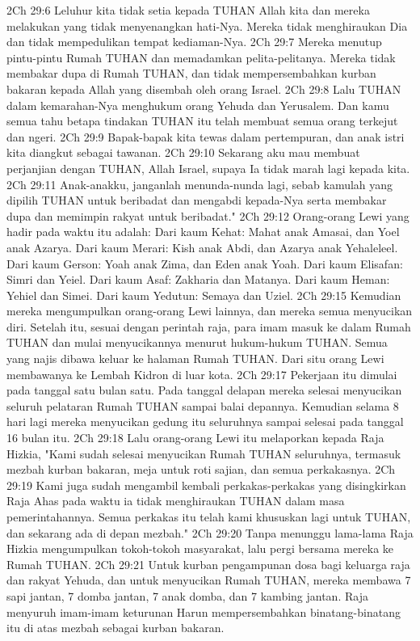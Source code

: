 2Ch 29:6  Leluhur kita tidak setia kepada TUHAN Allah kita dan mereka melakukan yang tidak menyenangkan hati-Nya. Mereka tidak menghiraukan Dia dan tidak mempedulikan tempat kediaman-Nya.
2Ch 29:7  Mereka menutup pintu-pintu Rumah TUHAN dan memadamkan pelita-pelitanya. Mereka tidak membakar dupa di Rumah TUHAN, dan tidak mempersembahkan kurban bakaran kepada Allah yang disembah oleh orang Israel.
2Ch 29:8  Lalu TUHAN dalam kemarahan-Nya menghukum orang Yehuda dan Yerusalem. Dan kamu semua tahu betapa tindakan TUHAN itu telah membuat semua orang terkejut dan ngeri.
2Ch 29:9  Bapak-bapak kita tewas dalam pertempuran, dan anak istri kita diangkut sebagai tawanan.
2Ch 29:10  Sekarang aku mau membuat perjanjian dengan TUHAN, Allah Israel, supaya Ia tidak marah lagi kepada kita.
2Ch 29:11  Anak-anakku, janganlah menunda-nunda lagi, sebab kamulah yang dipilih TUHAN untuk beribadat dan mengabdi kepada-Nya serta membakar dupa dan memimpin rakyat untuk beribadat."
2Ch 29:12  Orang-orang Lewi yang hadir pada waktu itu adalah: Dari kaum Kehat: Mahat anak Amasai, dan Yoel anak Azarya. Dari kaum Merari: Kish anak Abdi, dan Azarya anak Yehaleleel. Dari kaum Gerson: Yoah anak Zima, dan Eden anak Yoah. Dari kaum Elisafan: Simri dan Yeiel. Dari kaum Asaf: Zakharia dan Matanya. Dari kaum Heman: Yehiel dan Simei. Dari kaum Yedutun: Semaya dan Uziel.
2Ch 29:15  Kemudian mereka mengumpulkan orang-orang Lewi lainnya, dan mereka semua menyucikan diri. Setelah itu, sesuai dengan perintah raja, para imam masuk ke dalam Rumah TUHAN dan mulai menyucikannya menurut hukum-hukum TUHAN. Semua yang najis dibawa keluar ke halaman Rumah TUHAN. Dari situ orang Lewi membawanya ke Lembah Kidron di luar kota.
2Ch 29:17  Pekerjaan itu dimulai pada tanggal satu bulan satu. Pada tanggal delapan mereka selesai menyucikan seluruh pelataran Rumah TUHAN sampai balai depannya. Kemudian selama 8 hari lagi mereka menyucikan gedung itu seluruhnya sampai selesai pada tanggal 16 bulan itu.
2Ch 29:18  Lalu orang-orang Lewi itu melaporkan kepada Raja Hizkia, "Kami sudah selesai menyucikan Rumah TUHAN seluruhnya, termasuk mezbah kurban bakaran, meja untuk roti sajian, dan semua perkakasnya.
2Ch 29:19  Kami juga sudah mengambil kembali perkakas-perkakas yang disingkirkan Raja Ahas pada waktu ia tidak menghiraukan TUHAN dalam masa pemerintahannya. Semua perkakas itu telah kami khususkan lagi untuk TUHAN, dan sekarang ada di depan mezbah."
2Ch 29:20  Tanpa menunggu lama-lama Raja Hizkia mengumpulkan tokoh-tokoh masyarakat, lalu pergi bersama mereka ke Rumah TUHAN.
2Ch 29:21  Untuk kurban pengampunan dosa bagi keluarga raja dan rakyat Yehuda, dan untuk menyucikan Rumah TUHAN, mereka membawa 7 sapi jantan, 7 domba jantan, 7 anak domba, dan 7 kambing jantan. Raja menyuruh imam-imam keturunan Harun mempersembahkan binatang-binatang itu di atas mezbah sebagai kurban bakaran.
